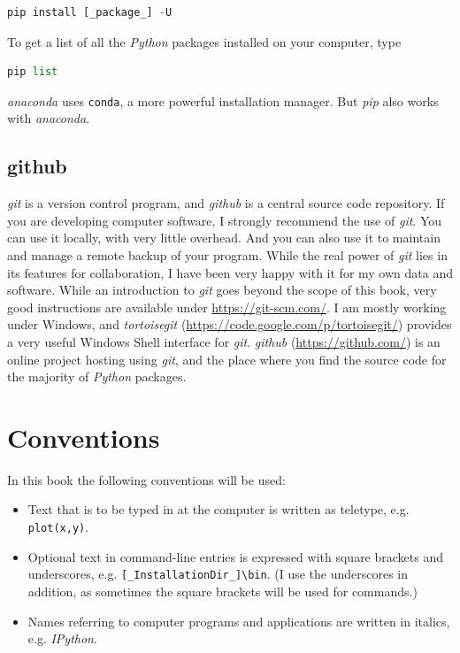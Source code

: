 \begin{lstlisting}[language=Python]
    pip install [_package_] -U
\end{lstlisting}

To get a list of all the \emph{Python} packages installed on your computer, type

\begin{lstlisting}[language=Python]
    pip list
\end{lstlisting}

\emph{anaconda} uses \lstinline{conda}, a more powerful installation manager. But \emph{pip} also works with \emph{anaconda}.

\subsection{github}

\emph{git} is a version control program, and \emph{github} is a central source code repository. If you are developing computer software, I strongly recommend the use of \emph{git}. You can use it locally, with very little overhead. And you can also use it to maintain and manage a remote backup of your program. While the real power of \emph{git} lies in its features for collaboration, I have been very happy with it for my own data and software. While an introduction to \emph{git} goes beyond the scope of this book, very good instructions are available under \url{https://git-scm.com/}. I am mostly working under Windows, and \emph{tortoisegit} (\url{https://code.google.com/p/tortoisegit/}) provides a very useful Windows Shell interface for \emph{git}. \emph{github} (\url{https://github.com/}) is an online project hosting using \emph{git}, and the place where you find the source code for the majority of \emph{Python} packages.

\section{Conventions}

In this book the following conventions will be used:
\begin{itemize}
  \item Text that is to be typed in at the computer is written as teletype, e.g. \lstinline{plot(x,y)}.
  \item Optional text in command-line entries is expressed with square brackets and underscores, e.g. \lstinline{[_InstallationDir_]\bin}. (I use the underscores in addition, as sometimes the square brackets will be used for commands.)
  \item Names referring to computer programs and applications are written in italics, e.g. \emph{IPython}.

\end{itemize}


